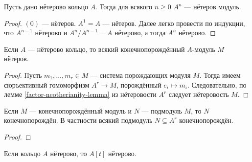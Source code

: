 \documentclass[12pt,a4paper]{article}
\begin{document}
    \begin{lemma}
        Пусть дано нётерово кольцо $A$. Тогда для всякого $n \geqslant 0$ $A^n$ --- нётеров модуль.
    \end{lemma}

    \begin{proof}
        $(0)$ --- нётеров. $A^1 = A$ --- нётеров. Далее легко провести по индукции, что $A^{n-1}$ нётерово и $A^n / A^{n-1} = A$ нётерово, а тогда $A^n$ нётерово.
    \end{proof}

    \begin{corollary}
        Если $A$ --- нётерово кольцо, то всякий конечнопорождённый $A$-модуль $M$ нётеров.
    \end{corollary}

    \begin{proof}
        Пусть $m_1, \dots, m_r \in M$ --- система порождающих модуля $M$. Тогда имеем сюръективный гомоморфизм $A^r \to M$, порождённый $e_i \mapsto m_i$. Следовательно, по лемме \ref{factor-neotherianity-lemma} из нётеровости $A^r$ следует нётеровость $M$.
    \end{proof}

    \begin{corollary}
        Если $M$ --- конечнопорождённый модуль и $N$ --- подмодуль $M$, то $N$ конечнопорождён. В частности всякий подмодуль $N \subseteq A^r$ конечнопорождён.
    \end{corollary}

    \begin{proof}
    \end{proof}

    \begin{theorem}[Гильберта]
        Если кольцо $A$ нётерово, то $A[t]$ нётерово.
    \end{theorem}
\end{document}
